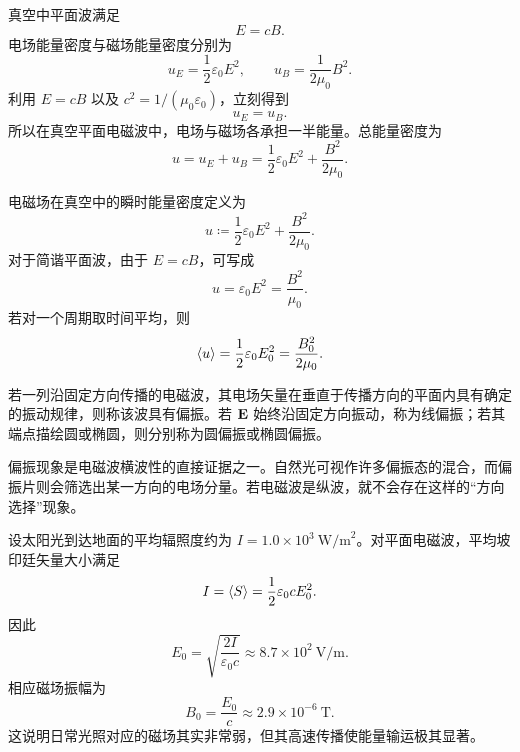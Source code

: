 真空中平面波满足
\[
E=cB.
\]
电场能量密度与磁场能量密度分别为
\[
u_E=\frac{1}{2}\varepsilon_0 E^2,
\qquad
u_B=\frac{1}{2\mu_0}B^2.
\]
利用 $E=cB$ 以及 $c^2=1/(\mu_0\varepsilon_0)$，立刻得到
\[
u_E=u_B.
\]
所以在真空平面电磁波中，电场与磁场各承担一半能量。总能量密度为
\[
u=u_E+u_B=\frac{1}{2}\varepsilon_0 E^2+\frac{B^2}{2\mu_0}.
\]

\begin{definition}[电磁波的能量密度]
电磁场在真空中的瞬时能量密度定义为
\[
 u\coloneqq \frac{1}{2}\varepsilon_0 E^2+\frac{B^2}{2\mu_0}.
\]
对于简谐平面波，由于 $E=cB$，可写成
\[
 u=\varepsilon_0 E^2=\frac{B^2}{\mu_0}.
\]
若对一个周期取时间平均，则
\[
 \langle u \rangle=\frac{1}{2}\varepsilon_0 E_0^2=\frac{B_0^2}{2\mu_0}.
\]
\end{definition}

\begin{definition}[偏振]
若一列沿固定方向传播的电磁波，其电场矢量在垂直于传播方向的平面内具有确定的振动规律，则称该波具有偏振。若 $\vb{E}$ 始终沿固定方向振动，称为线偏振；若其端点描绘圆或椭圆，则分别称为圆偏振或椭圆偏振。
\end{definition}

偏振现象是电磁波横波性的直接证据之一。自然光可视作许多偏振态的混合，而偏振片则会筛选出某一方向的电场分量。若电磁波是纵波，就不会存在这样的“方向选择”现象。

\begin{example}[太阳光辐照下的场强估算]
设太阳光到达地面的平均辐照度约为 $I=1.0\times 10^3\ \text{W/m}^2$。对平面电磁波，平均坡印廷矢量大小满足
\[
I=\langle S \rangle=\frac{1}{2}\varepsilon_0 c E_0^2.
\]
因此
\[
E_0=\sqrt{\frac{2I}{\varepsilon_0 c}}\approx 8.7\times10^2\ \text{V/m}.
\]
相应磁场振幅为
\[
B_0=\frac{E_0}{c}\approx 2.9\times10^{-6}\ \text{T}.
\]
这说明日常光照对应的磁场其实非常弱，但其高速传播使能量输运极其显著。
\end{example}

\begin{center}
\end{center}


